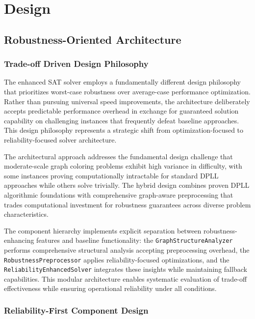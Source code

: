 \section{Design}

\subsection{Robustness-Oriented Architecture}

\subsubsection{Trade-off Driven Design Philosophy}

The enhanced SAT solver employs a fundamentally different design philosophy that prioritizes worst-case robustness over average-case performance optimization. Rather than pursuing universal speed improvements, the architecture deliberately accepts predictable performance overhead in exchange for guaranteed solution capability on challenging instances that frequently defeat baseline approaches. This design philosophy represents a strategic shift from optimization-focused to reliability-focused solver architecture.

The architectural approach addresses the fundamental design challenge that moderate-scale graph coloring problems exhibit high variance in difficulty, with some instances proving computationally intractable for standard DPLL approaches while others solve trivially. The hybrid design combines proven DPLL algorithmic foundations with comprehensive graph-aware preprocessing that trades computational investment for robustness guarantees across diverse problem characteristics.

The component hierarchy implements explicit separation between robustness-enhancing features and baseline functionality: the \texttt{GraphStructureAnalyzer} performs comprehensive structural analysis accepting preprocessing overhead, the \texttt{RobustnessPreprocessor} applies reliability-focused optimizations, and the \texttt{ReliabilityEnhancedSolver} integrates these insights while maintaining fallback capabilities. This modular architecture enables systematic evaluation of trade-off effectiveness while ensuring operational reliability under all conditions.

\subsubsection{Reliability-First Component Design}

